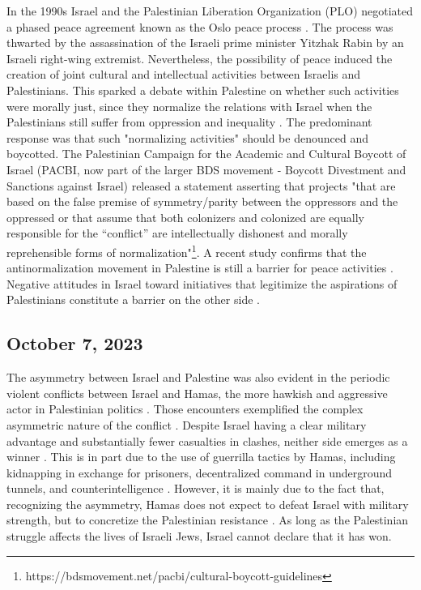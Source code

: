 \documentclass[dissertation,math,vertlayout,pdfa,colorlinks]{aaltoseries}
\begin{document}
In the 1990s Israel and the Palestinian Liberation Organization (PLO) negotiated a phased peace agreement known as the Oslo peace process \cite{bickertonOsloPeaceProcess2022}. The process was thwarted by the assassination of the Israeli prime minister Yitzhak Rabin by an Israeli right-wing extremist. Nevertheless, the possibility of peace induced the creation of joint cultural and intellectual activities between Israelis and Palestinians. This sparked a debate within Palestine on whether such activities were morally just, since they normalize the relations with Israel when the Palestinians still suffer from oppression and inequality \cite{miariAttitudesPalestiniansNormalization1999}. The predominant response was that such "normalizing activities" should be denounced and boycotted. The Palestinian Campaign for the Academic and Cultural Boycott of Israel (PACBI, now part of the larger BDS movement - Boycott Divestment and Sanctions against Israel) released a statement asserting that projects "that are based on the false premise of symmetry/parity between the oppressors and the oppressed or that assume that both colonizers and colonized are equally responsible for the “conflict” are intellectually dishonest and morally reprehensible forms of normalization"\footnote{https://bdsmovement.net/pacbi/cultural-boycott-guidelines}. A recent study confirms that the antinormalization movement in Palestine is still a barrier for peace activities \cite{hassounaSpacesDialogueSegregated2016}. Negative attitudes in Israel toward initiatives that legitimize the aspirations of Palestinians constitute a barrier on the other side \cite{hassounaSpacesDialogueSegregated2016}.

\subsection{October 7, 2023}
The asymmetry between Israel and Palestine was also evident in the periodic violent conflicts between Israel and Hamas, the more hawkish and aggressive actor in Palestinian politics \cite{pearlmanPalestinianNationalism2022}. Those encounters exemplified the complex asymmetric nature of the conflict \cite{rossBarriersAgreementAsymmetric2014}. Despite Israel having a clear military advantage and substantially fewer casualties in clashes, neither side emerges as a winner \cite{hitmanWinnerDoesNot2023}. This is in part due to the use of guerrilla tactics by Hamas, including kidnapping in exchange for prisoners, decentralized command in underground tunnels, and counterintelligence \cite{flamerAsymmetricBattleWits2025}. However, it is mainly due to the fact that, recognizing the asymmetry, Hamas does not expect to defeat Israel with military strength, but to concretize the Palestinian resistance \cite{hitmanWinnerDoesNot2023}. As long as the Palestinian struggle affects the lives of Israeli Jews, Israel cannot declare that it has won.
\end{document}
